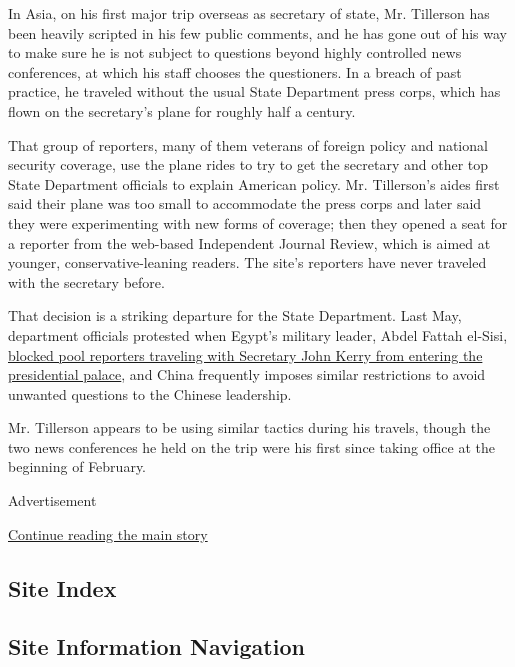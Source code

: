 In Asia, on his first major trip overseas as secretary of state, Mr.
Tillerson has been heavily scripted in his few public comments, and he
has gone out of his way to make sure he is not subject to questions
beyond highly controlled news conferences, at which his staff chooses
the questioners. In a breach of past practice, he traveled without the
usual State Department press corps, which has flown on the secretary's
plane for roughly half a century.

That group of reporters, many of them veterans of foreign policy and
national security coverage, use the plane rides to try to get the
secretary and other top State Department officials to explain American
policy. Mr. Tillerson's aides first said their plane was too small to
accommodate the press corps and later said they were experimenting with
new forms of coverage; then they opened a seat for a reporter from the
web-based Independent Journal Review, which is aimed at younger,
conservative-leaning readers. The site's reporters have never traveled
with the secretary before.

That decision is a striking departure for the State Department. Last
May, department officials protested when Egypt's military leader, Abdel
Fattah el-Sisi,
\href{https://www.nytimes3xbfgragh.onion/2016/05/19/insider/egypt-john-kerry-abdel-fattah-el-sisi.html}{blocked
pool reporters traveling with Secretary John Kerry from entering the
presidential palace}, and China frequently imposes similar restrictions
to avoid unwanted questions to the Chinese leadership.

Mr. Tillerson appears to be using similar tactics during his travels,
though the two news conferences he held on the trip were his first since
taking office at the beginning of February.

Advertisement

\protect\hyperlink{after-bottom}{Continue reading the main story}

\hypertarget{site-index}{%
\subsection{Site Index}\label{site-index}}

\hypertarget{site-information-navigation}{%
\subsection{Site Information
Navigation}\label{site-information-navigation}}

